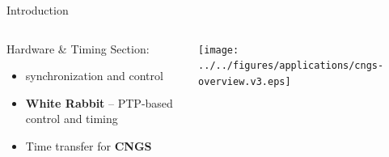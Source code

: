 \documentclass[compress,red]{beamer}
\begin{document}
\begin{frame}{Introduction}

\begin{columns}[c]

     \begin{block}{Hardware \& Timing Section:} 
	\begin{itemize}
	  \item synchronization and control
	  \item \textbf{White Rabbit} -- PTP-based control and timing 
	  \item Time transfer for \textbf{CNGS}
	\end{itemize}
     \end{block}

    \begin{center}
\pause
      \texttt{[image: ../../figures/applications/cngs-overview.v3.eps]}
    \end{center}
\end{columns}

\end{frame}
\end{document}
